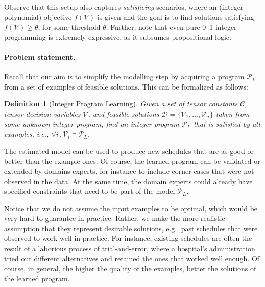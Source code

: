 \documentclass{article}
\newcommand{\luc}[1]{{\bf \textcolor{red}{{Luc: #1}}}}
\newcommand{\stefano}[1]{{\bf \textcolor{violet}{{Stefano: #1}}}}
\newcommand{\dataset}{\ensuremath{\mathcal{D}}\xspace}
\newcommand{\variables}{\ensuremath{\mathcal{V}}\xspace}
\newcommand{\constants}{\ensuremath{\mathcal{C}}\xspace}
\newcommand{\program}{\ensuremath{\mathcal{P}}\xspace}
\newtheorem*{definition}{Definition}
\renewcommand\[{\begin{equation}}
\renewcommand\]{\end{equation}}
\begin{document}
Observe that this setup also captures \emph{satisficing} scenarios, where an
(integer polynomial) objective $f(\variables)$ is given and the goal is to find
solutions satisfying $f(\variables) \ge \theta$, for some threshold $\theta$.
Further, note that even pure 0--1 integer programming is extremely expressive,
as it subsumes propositional logic.




\paragraph{Problem statement.} Recall that our aim is to simplify the modelling
step by acquiring a program $\program_L$ from a set of examples of feasible
solutions.  This can be formalized as follows:

\begin{definition}[Integer Program Learning]
    Given a set of tensor constants \constants, tensor decision variables
    \variables, and feasible solutions $\dataset = \{\variables_1, \ldots,
    \variables_n\}$ taken from some unknown integer program, find an integer
    program $\program_L$ that is satisfied by all  examples, i.e., $\forall i \,.\, \variables_i
    \models \program_L$.
\end{definition}

The estimated model can be used to produce new schedules that are as good or
better than the example ones.  Of course, the learned program can be validated
or extended by domains experts, for instance to include corner cases that were
not observed in the data.  At the same time, the domain experts could already
have specified  constraints that need to be part of the model $\program_L$.

Notice that we do not assume the input examples to be optimal, which would be
very hard to guarantee in practice.  Rather, we make the more realistic
assumption that they represent desirable solutions, e.g., past schedules that
were observed to work well in practice.  For instance, existing schedules are
often the result of a laborious process of trial-and-error, where a hospital's
administration tried out different alternatives and retained the ones that
worked well enough.  Of course, in general, the higher the quality of the examples, better the solutions of the learned program.
\end{document}
